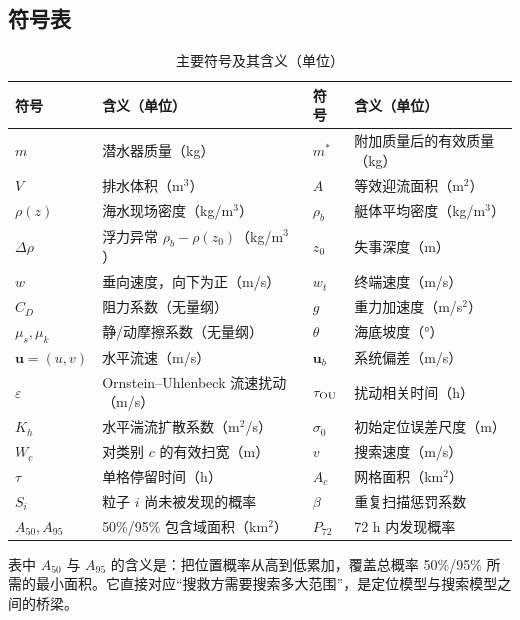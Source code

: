 \subsection{符号表}

\begin{table}[H]
\centering\small
\caption{主要符号及其含义（单位）}
\label{tab:symbols}
\begin{tabular}{@{}llll@{}}
\toprule
符号 & 含义（单位） & 符号 & 含义（单位）\\
\midrule
$m$ & 潜水器质量（kg） & $m^*$ & 附加质量后的有效质量（kg）\\
$V$ & 排水体积（m$^3$） & $A$ & 等效迎流面积（m$^2$）\\
$\rho(z)$ & 海水现场密度（kg/m$^3$） & $\rho_b$ & 艇体平均密度（kg/m$^3$）\\
$\Delta\rho$ & 浮力异常 $\rho_b-\rho(z_0)$（kg/m$^3$） & $z_0$ & 失事深度（m）\\
$w$ & 垂向速度，向下为正（m/s） & $w_t$ & 终端速度（m/s）\\
$C_D$ & 阻力系数（无量纲） & $g$ & 重力加速度（m/s$^2$）\\
$\mu_s,\mu_k$ & 静/动摩擦系数（无量纲） & $\theta$ & 海底坡度（°）\\
$\bm u=(u,v)$ & 水平流速（m/s） & $\bm u_b$ & 系统偏差（m/s）\\
$\varepsilon$ & Ornstein--Uhlenbeck 流速扰动（m/s） & $\tau_{\rm OU}$ & 扰动相关时间（h）\\
$K_h$ & 水平湍流扩散系数（m$^2$/s） & $\sigma_0$ & 初始定位误差尺度（m）\\
$W_c$ & 对类别 $c$ 的有效扫宽（m） & $v$ & 搜索速度（m/s）\\
$\tau$ & 单格停留时间（h） & $A_c$ & 网格面积（km$^2$）\\
$S_i$ & 粒子 $i$ 尚未被发现的概率 & $\beta$ & 重复扫描惩罚系数\\
$A_{50},A_{95}$ & 50\%/95\% 包含域面积（km$^2$） & $P_{72}$ & 72 h 内发现概率\\
\bottomrule
\end{tabular}
\end{table}

表中 $A_{50}$ 与 $A_{95}$ 的含义是：把位置概率从高到低累加，覆盖总概率 50\%/95\%
所需的最小面积。它直接对应“搜救方需要搜索多大范围”，是定位模型与搜索模型之间的桥梁。
